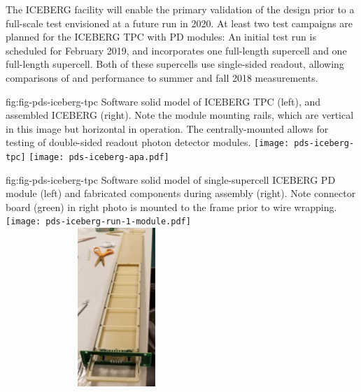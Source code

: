 
The ICEBERG facility will enable the primary validation of the  design prior to a full-scale test envisioned at a future  run in 2020. 
At least two test campaigns are planned for the ICEBERG TPC with PD modules:  An initial test run is scheduled for February 2019, and incorporates one full-length  supercell and one full-length  supercell.  Both of these supercells 
use single-sided readout, allowing comparisons of  and  performance to summer and fall 2018  measurements.


 \begin{dunefigure}
 {fig:fig-pds-iceberg-tpc}
 {Software solid model of ICEBERG TPC (left), and assembled ICEBERG  (right).  Note the  module mounting rails, which are vertical in this image but horizontal in operation. The centrally-mounted  allows for testing of double-sided readout photon detector modules.}
\texttt{[image: pds-iceberg-tpc]}
\texttt{[image: pds-iceberg-apa.pdf]}
\end{dunefigure}



\begin{dunefigure}
 {fig:fig-pds-iceberg-tpc}
 {Software solid model of single-supercell ICEBERG PD module (left) and fabricated components during assembly (right).  Note connector board (green) in right photo is mounted to the  frame prior to wire wrapping.}
\texttt{[image: pds-iceberg-run-1-module.pdf]}
\includegraphics[angle=0,width=8.4cm,height=6cm]{graphics/pds-iceberg-module-assembly-photo.pdf}
\end{dunefigure}

